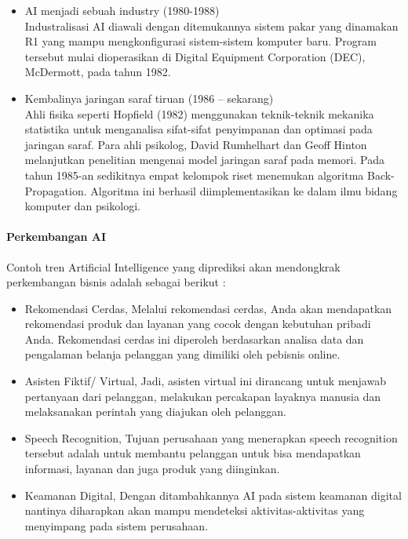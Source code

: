 \begin{itemize}
    \item AI menjadi sebuah industry (1980-1988) \\
    Industralisasi AI diawali dengan ditemukannya sistem pakar yang dinamakan R1 yang mampu mengkonfigurasi sistem-sistem komputer baru. Program tersebut mulai dioperasikan di Digital Equipment Corporation (DEC), McDermott, pada tahun 1982.
    
    \item Kembalinya jaringan saraf tiruan (1986 – sekarang) \\
    Ahli fisika seperti Hopfield (1982) menggunakan teknik-teknik mekanika statistika untuk menganalisa sifat-sifat penyimpanan dan optimasi pada jaringan saraf. Para ahli psikolog, David Rumhelhart dan Geoff Hinton melanjutkan penelitian mengenai model jaringan saraf pada memori. Pada tahun 1985-an sedikitnya empat kelompok riset menemukan algoritma Back-Propagation. Algoritma ini berhasil diimplementasikan ke dalam ilmu bidang komputer dan psikologi.
\end{itemize}

 \paragraph{Perkembangan AI}Contoh tren Artificial Intelligence yang diprediksi akan mendongkrak perkembangan bisnis adalah sebagai berikut :
 \begin{itemize}
     \item Rekomendasi Cerdas, Melalui rekomendasi cerdas, Anda akan mendapatkan rekomendasi produk dan layanan yang cocok dengan kebutuhan pribadi Anda. Rekomendasi cerdas ini diperoleh berdasarkan analisa data dan pengalaman belanja pelanggan yang dimiliki oleh pebisnis online.
     
     \item Asisten Fiktif/ Virtual, Jadi, asisten virtual ini dirancang untuk menjawab pertanyaan dari pelanggan, melakukan percakapan layaknya manusia dan melaksanakan perintah yang diajukan oleh pelanggan.
     
     \item Speech Recognition, Tujuan perusahaan yang menerapkan speech recognition tersebut adalah untuk membantu pelanggan untuk bisa mendapatkan informasi, layanan dan juga produk yang diinginkan.
     
     \item Keamanan Digital, Dengan ditambahkannya AI pada sistem keamanan digital nantinya diharapkan akan mampu mendeteksi  aktivitas-aktivitas yang menyimpang pada sistem perusahaan.
 \end{itemize}
 
